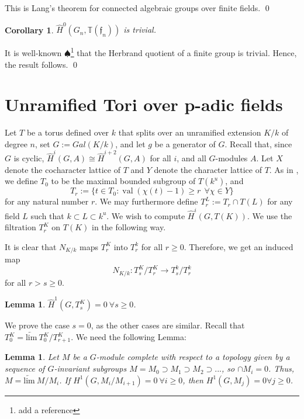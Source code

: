 \documentclass[11pt]{amsart}
\theoremstyle{plain}
\newtheorem{corollary}[theorem]{Corollary}
\newtheorem{lemma}[theorem]{Lemma}
\newcommand{\DRxxx}[1]{$\spadesuit$\footnote{#1}}
\theoremstyle{definition}
\DeclareMathOperator{\val}{val}
\begin{document}
\proof
This is Lang's theorem for connected algebraic groups over finite fields.
\qed

\begin{corollary}
$\hat{H}^0(G_n,\mathbb{T}(\mathfrak{f}_n))$ is trivial.
\end{corollary}

\proof
It is well-known
\DRxxx{add a reference}
that the Herbrand quotient of a finite group is trivial.  Hence, the result follows.
\qed

\section{Unramified Tori over p-adic fields}

Let $T$ be a torus defined over $k$ that splits over an unramified
extension $K/k$ of degree $n$, set $G := Gal(K/k)$, and let $g$ be a
generator of $G$.  Recall that, since $G$ is cyclic,
$\hat{H}^{i}(G,A)\cong \hat{H}^{i+2}(G,A)$ for all $i$, and all
$G$-modules $A$.  Let $X$ denote the cocharacter lattice of $T$ and
$Y$ denote the character lattice of $T$.  As in \cite[Section 3]{moyprasad1},
we define $T_0$ to be the maximal bounded subgroup of
$T(k^u)$, and
$$T_r := \{t \in T_0 : \val(\chi(t) - 1) \geq r \ \ \forall \chi \in Y \}$$
for any natural number $r$.  We may
furthermore define $T_r^L := T_r \cap T(L)$ for any field $L$ such
that $k \subset L \subset k^u$.  We wish to compute $\hat{H}^i(G, T(K))$.
We use the filtration $T_r^K$ on $T(K)$ in the following way.

It is clear that $N_{K/k}$ maps $T_r^K$ into $T_r^k$ for all $r \geq 0$.
Therefore, we get an induced map
$$N_{K/k} : T_s^K / T_{r}^K \rightarrow T_s^k / T_{r}^k$$
for all $r > s \geq 0$.

\begin{lemma}\label{H1compactpart}
$\hat{H}^1(G, T_{s}^K) = 0 \ \forall s \geq 0$.
\end{lemma}

\proof
We prove the case $s = 0$, as the other cases are similar.  Recall
that $T_0^K = \underleftarrow{\mathrm{lim}} \ T_0^K / T_{r+1}^K$.  We
need the following Lemma:

\begin{lemma}\label{abstractcohomology}
  Let $M$ be a $G$-module complete with respect to a topology given by
  a sequence of $G$-invariant subgroups $M = M_0 \supset M_1 \supset
  M_2 \supset ...$, so $\cap M_i = 0$.  Thus,
  $M = \underleftarrow{\mathrm{lim}} \ M / M_i$.
  If $H^1(G, M_i / M_{i+1}) = 0 \ \forall i \geq 0$,
  then $H^1(G, M_j) = 0 \forall j \geq 0$.
\end{lemma}
\end{document}
